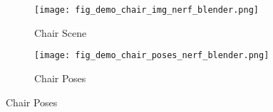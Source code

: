 \begin{figure}[H]
    \centering
    \begin{subfigure}{0.48\linewidth}
        \texttt{[image: fig\_demo\_chair\_img\_nerf\_blender.png]}
        \caption{Chair Scene}
    \end{subfigure}
    \begin{subfigure}{0.48\linewidth}
        \texttt{[image: fig\_demo\_chair\_poses\_nerf\_blender.png]}
        \caption{Chair Poses}
    \end{subfigure}
    \label{fig:dataset_nerf_blender_chair}
\end{figure}